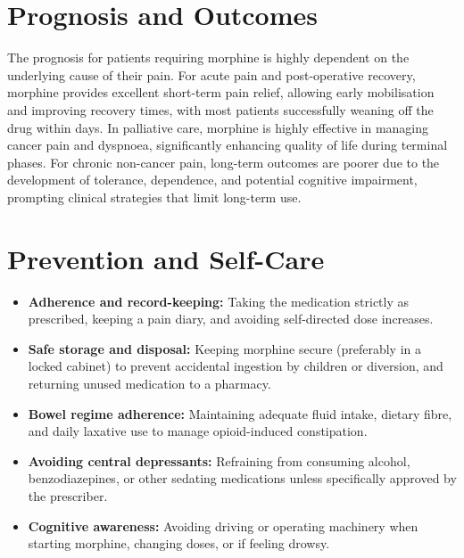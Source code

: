 \section*{Prognosis and Outcomes}
The prognosis for patients requiring morphine is highly dependent on the underlying cause of their pain. For acute pain and post-operative recovery, morphine provides excellent short-term pain relief, allowing early mobilisation and improving recovery times, with most patients successfully weaning off the drug within days. In palliative care, morphine is highly effective in managing cancer pain and dyspnoea, significantly enhancing quality of life during terminal phases. For chronic non-cancer pain, long-term outcomes are poorer due to the development of tolerance, dependence, and potential cognitive impairment, prompting clinical strategies that limit long-term use.

\section*{Prevention and Self-Care}
\begin{itemize}
    \item \textbf{Adherence and record-keeping:} Taking the medication strictly as prescribed, keeping a pain diary, and avoiding self-directed dose increases.
    \item \textbf{Safe storage and disposal:} Keeping morphine secure (preferably in a locked cabinet) to prevent accidental ingestion by children or diversion, and returning unused medication to a pharmacy.
    \item \textbf{Bowel regime adherence:} Maintaining adequate fluid intake, dietary fibre, and daily laxative use to manage opioid-induced constipation.
    \item \textbf{Avoiding central depressants:} Refraining from consuming alcohol, benzodiazepines, or other sedating medications unless specifically approved by the prescriber.
    \item \textbf{Cognitive awareness:} Avoiding driving or operating machinery when starting morphine, changing doses, or if feeling drowsy.
\end{itemize}

